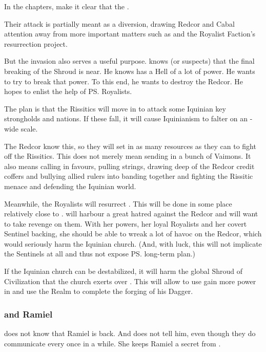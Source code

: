 In the \Narkiza chapters, make it clear that the . 

Their attack is partially meant as a diversion, drawing Redcor and Cabal attention away from more important matters such as \Nithdornazsh{} and the Royalist Faction's resurrection project. 

But the invasion also serves a useful purpose. 
\Secherdamon{} knows (or suspects) that the final breaking of the Shroud is near. 
He knows \iquin{} has a Hell of a lot of power. 
He wants to try to break that power. 
To this end, he wants to destroy the Redcor. 
He hopes to enlist the help of \ps{\Shiaraid} Royalists. 

The plan is that the Rissitics will move in to attack some Iquinian key strongholds and nations. 
If these fall, it will cause Iquinianism to falter on an \Azmith-wide scale. 

The Redcor know this, so they will set in as many resources as they can to fight off the Rissitics. 
This does not merely mean sending in a bunch of Vaimons. 
It also means calling in favours, pulling strings, drawing deep of the Redcor credit coffers and bullying allied rulers into banding together and fighting the Rissitic menace and defending the Iquinian world.

Meanwhile, the Royalists will resurrect \Shiaraid. 
This will be done in some place relatively close to \Redce. 
\Shiaraid{} will harbour a great hatred against the Redcor and will want to take revenge on them. 
With her \sathariah{} powers, her loyal Royalists and her covert Sentinel backing, she should be able to wreak a lot of havoc on the Redcor, which would seriously harm the Iquinian church. 
(And, with luck, this will not implicate the Sentinels at all and thus not expose \ps{\Secherdamon} long-term plan.)

If the Iquinian church can be destabilized, it will harm the global Shroud of Civilization that the church exerts over \Azmith. 
This will allow \Secherdamon{} to use gain more power in \Azmith{} and use the Realm to complete the forging of his Dagger. 





\subsubsection{\Secherdamon{} and Ramiel}
\Secherdamon{} does not know that Ramiel is back. 
And \Shiaraid{} does not tell him, even though they do communicate every once in a while. 
She keeps Ramiel a secret from \Secherdamon.

